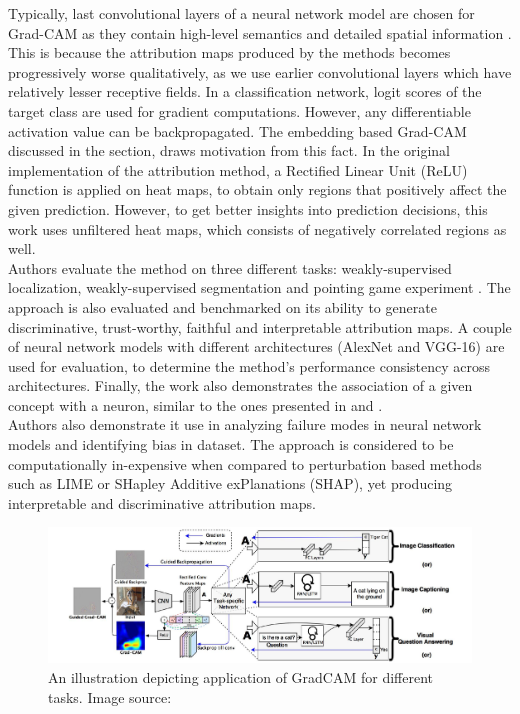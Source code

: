 \documentclass[../report.tex]{subfiles}
\begin{document}
	Typically, last convolutional layers of a neural network model are chosen for Grad-CAM as they contain high-level semantics and detailed spatial information \cite{selvaraju2017grad}. This is because the attribution maps produced by the methods becomes progressively worse qualitatively,  as we use earlier convolutional layers which have relatively lesser receptive fields. In a classification network, logit scores of the target class are used for gradient computations. However, any differentiable activation value can be backpropagated. The embedding based Grad-CAM discussed in the section, draws motivation from this fact. In the original implementation of the attribution method, a Rectified Linear Unit (ReLU) function is applied on heat maps, to obtain only regions that positively affect the given prediction. However, to get better insights into prediction decisions, this work uses unfiltered heat maps, which consists of negatively correlated regions as well.\\  
   Authors evaluate the method on three different tasks: weakly-supervised localization, weakly-supervised segmentation and pointing game experiment \cite{zhang2018top}. The approach is also evaluated and benchmarked on its ability to generate discriminative, trust-worthy, faithful and interpretable attribution maps. A couple of neural network models with different architectures (AlexNet \cite{krizhevsky2012imagenet} and VGG-16) are used for evaluation, to determine the method’s performance consistency across architectures.
   Finally, the work also demonstrates the association of a given concept with a neuron, similar to the ones presented in \cite{matthew2014visualizing} and \cite{zhou2014object}.\\
	Authors also demonstrate it use in analyzing failure modes in neural network models and identifying bias in dataset.
	The approach is considered to be computationally in-expensive when compared to perturbation based methods such as LIME or SHapley Additive exPlanations (SHAP)\cite{shap}, yet producing interpretable and discriminative attribution maps.
	 \begin{figure}[H]
		\hspace{-1cm}
		\includegraphics[scale=0.3]{images/chapter3/gradcam.png}
		\caption{An illustration depicting application of GradCAM for different tasks. Image source: \cite{selvaraju2017grad}}
		\label{fig_gradcam}
	\end{figure}
	
\end{document}
